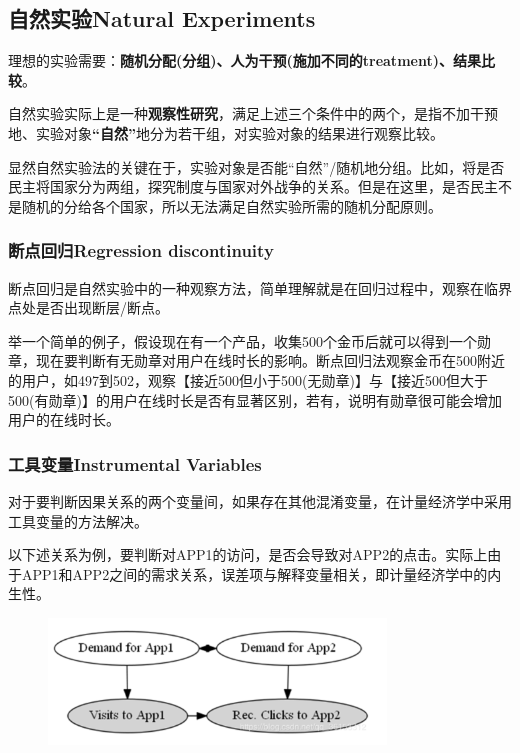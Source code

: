 \documentclass[12pt]{article}
\begin{document}
\subsection{自然实验Natural Experiments}
理想的实验需要：\textbf{随机分配(分组)、人为干预(施加不同的treatment)、结果比较}。

自然实验实际上是一种\textbf{观察性研究}，满足上述三个条件中的两个，是指不加干预地、实验对象\textbf{“自然”}地分为若干组，对实验对象的结果进行观察比较。

显然自然实验法的关键在于，实验对象是否能“自然”/随机地分组。比如，将是否民主将国家分为两组，探究制度与国家对外战争的关系。但是在这里，是否民主不是随机的分给各个国家，所以无法满足自然实验所需的随机分配原则。

\subsubsection{断点回归Regression discontinuity}
断点回归是自然实验中的一种观察方法，简单理解就是在回归过程中，观察在临界点处是否出现断层/断点。

举一个简单的例子，假设现在有一个产品，收集500个金币后就可以得到一个勋章，现在要判断有无勋章对用户在线时长的影响。断点回归法观察金币在500附近的用户，如497到502，观察【接近500但小于500(无勋章)】与【接近500但大于500(有勋章)】的用户在线时长是否有显著区别，若有，说明有勋章很可能会增加用户的在线时长。

\subsubsection{工具变量Instrumental Variables}
对于要判断因果关系的两个变量间，如果存在其他混淆变量，在计量经济学中采用工具变量的方法解决。

以下述关系为例，要判断对APP1的访问，是否会导致对APP2的点击。实际上由于APP1和APP2之间的需求关系，误差项与解释变量相关，即计量经济学中的内生性。
\begin{figure}[H]
    \centering
    \includegraphics[width=0.8\textwidth]{fig/CasualInference-APP-User-Example.png}
\end{figure}
\end{document}
